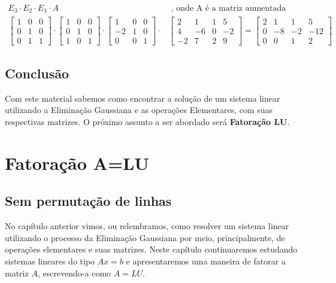 \documentclass[12pt]{article}
\begin{document}
\begin{align*}
	E_3\cdot E_2 \cdot E_1 \cdot A &\mbox{ , onde A é a matriz aumentada} \\
	\begin{bmatrix}
		1 & 0 &0\\
		0 & 1 & 0\\
		0 & 1 & 1
	\end{bmatrix}\cdot
	\begin{bmatrix}
		1 & 0 &0\\
		0 & 1 & 0\\
		1 & 0 & 1
	\end{bmatrix} \cdot
	\begin{bmatrix}
		1 & 0 &0\\
		-2 & 1 & 0\\
		0 & 0 & 1
	\end{bmatrix} \cdot&
	\begin{bmatrix}
		2 & 1 & 1 & 5\\
		4 & -6 & 0 & -2\\
		-2 & 7 & 2 & 9
	\end{bmatrix} = 
	\begin{bmatrix}
		2 & 1 & 1 & 5\\
		0 & -8 & -2 & -12\\
		0 & 0 & 1 & 2
	\end{bmatrix}
\end{align*}

\subsection{Conclusão}
Com este material sabemos como encontrar a solução de um sistema linear utilizando a Eliminação Gaussiana e as operações Elementares, com suas respectivas matrizes. O próximo assunto a ser abordado será \textbf{Fatoração LU}.

\newpage


\section{Fatoração A=LU}

\subsection{Sem permutação de linhas}

No capítulo anterior vimos, ou relembramos,  como resolver um sistema linear utilizando o processo da Eliminação Gaussiana por meio, principalmente, de operações elementares e suas matrizes. Neste capítulo continuaremos estudando sistemas lineares do tipo $Ax=b$ e apresentaremos uma maneira de fatorar a matriz $A$, escrevendo-a como $A=LU$.\\
\end{document}
